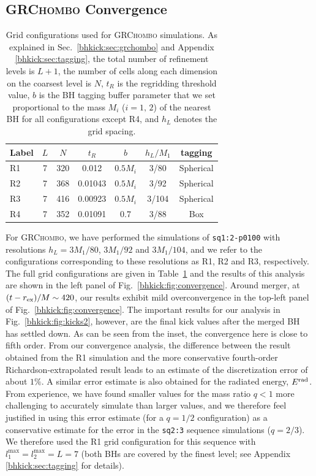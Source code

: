 \subsection{\textsc{GRChombo} Convergence}
\begin{table}[b]
    \caption{Grid configurations used for \textsc{GRChombo} simulations.
    As explained in Sec.~\ref{bhkick:sec:grchombo} and Appendix \ref{bhkick:sec:tagging},
    the total
    number of refinement levels is $L+1$, the number of cells along each
    dimension on the coarsest level is $N$, $t_R$ is the regridding
    threshold value, $b$ is the BH tagging buffer parameter
    that we
    set proportional to the mass $M_i$ ($i=1,\,2$)
    of the nearest BH for all configurations except R4,
    and $h_L$ denotes the grid spacing.
    }
    \centering
    \begin{tabular}{lcccccc}\hline
        Label & $L$ & $N$ & $t_R$ & $b$ & $h_L/M_1$ & tagging\\
        \hline
        R1 & 7 & 320 & 0.012 & $0.5M_i$ & 3/80 & Spherical \\
        R2 & 7 & 368 & 0.01043 & $0.5M_i$ & 3/92 & Spherical\\
        R3 & 7 & 416 & 0.00923 & $0.5M_i$ & 3/104 & Spherical\\
        R4 & 7 & 352 & 0.01091 & 0.7 & 3/88 & Box\\\hline
    \end{tabular}
    \label{bhkick:tab:grchombo-grids}
\end{table}
For \textsc{GRChombo}, we have performed the simulations of
\texttt{sq1:2-p0100} with resolutions $h_L=3M_1/80$, $3M_1/92$ and
$3M_1/104$, and we refer to the configurations corresponding to these
resolutions as R1, R2 and R3, respectively.
The full grid configurations
are given in Table~\ref{bhkick:tab:grchombo-grids} and the results of this
analysis are shown in the left panel of Fig.~\ref{bhkick:fig:convergence}. Around
merger, at $(t-r_{\rm ex})/M\sim 420$, our results exhibit mild
overconvergence
in the top-left panel of Fig.~\ref{bhkick:fig:convergence}.
The important results for our analysis in Fig.~\ref{bhkick:fig:kicks2},
however, are the final kick values after the merged BH has settled down.
As can be seen from the inset, the convergence here is close to
fifth order.
From our convergence
analysis, the difference between the result obtained from the R1 simulation
and the more conservative fourth-order Richardson-extrapolated result leads
to an estimate of the discretization error of about $1\%$. A similar error
estimate is also obtained for the radiated energy, $E^{\mathrm{rad}}$.
From experience, we have found smaller values for the mass ratio $q<1$
more challenging to accurately simulate than larger values, and we
therefore feel justified in using this error estimate (for a $q=1/2$
configuration) as a conservative estimate for the error in the
\texttt{sq2:3} sequence simulations ($q=2/3$). We therefore used the R1 grid
configuration for this sequence with  $l_1^{\max}=l_2^{\max}=L=7$
(both BHs are covered by
the finest level; see Appendix \ref{bhkick:sec:tagging} for details).

